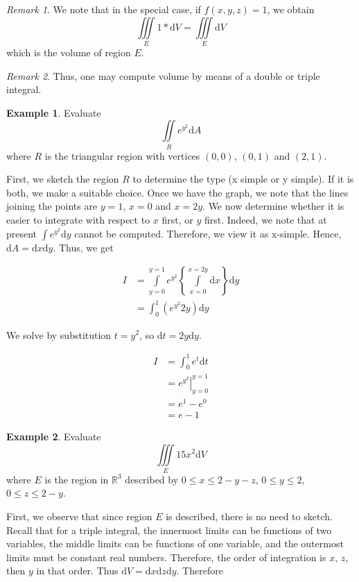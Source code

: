 \documentclass[11pt]{article}
\theoremstyle{plain} %
\theoremstyle{definition}
\theoremstyle{example}
\newtheorem*{example}{Example}
\theoremstyle{remark}
\newtheorem*{remark}{Remark}
\begin{document}
\begin{remark}
We note that in the special case, if $f(x, y, z) = 1$, we obtain $$\iiint\limits_E 1*\mathrm d V = \iiint\limits_E \mathrm d V$$which is the volume of region $E$. 

\end{remark}



\begin{remark}
Thus, one may compute volume by means of a double or triple integral.
\end{remark}


\begin{example}
Evaluate $$\iint\limits_R e^{y^2}\mathrm d A$$ where $R$ is the triangular region with vertices $(0,0)$, $(0,1)$ and $(2,1)$. 
\end{example}

First, we sketch the region $R$ to determine the type (x simple or y simple). If it is both, we make a suitable choice. Once we have the graph, we note that the lines joining the points are $y=1$, $x=0$ and $x=2y$. We now determine whether it is easier to integrate with respect to $x$ first, or $y$ first. Indeed, we note that at present $\int e^{y^2} \mathrm d y$ cannot be computed. Therefore, we view it as x-simple. Hence, $\mathrm d A = \mathrm d x \mathrm d y$. Thus, we get

\begin{align*}
I 	&= \int\limits_{y=0}^{y=1}e^{y^2}\left\{\int\limits_{x=0}^{x=2y}\mathrm d x\right\}\mathrm d y\\
	&= \int_0^1\left(e^{y^2}2y\right)\mathrm d y
\end{align*}

We solve by substitution $t=y^2$, so $\mathrm d t = 2y \mathrm d y$.

\begin{align*}
	I &= \int_0^1e^t\mathrm d t\\
	&= \left.e^{y^2}\right|_{y=0}^{y=1}\\
	&= e^1 - e^0\\
	&= e-1
\end{align*}

\begin{example}
Evaluate $$\iiint\limits_{E} 15x^2 \mathrm d V$$ where $ E$ is the region in $\mathbb R^3$ described by $0 \leq x \leq 2-y-z$, $0\leq y\leq 2$, $0\leq z \leq 2-y$.
\end{example}


First, we observe that since region $E$ is described, there is no need to sketch. Recall that for a triple integral, the innermost limits can be functions of two variables, the middle limits can be functions of one variable, and the outermost limits must be constant real numbers. Therefore, the order of integration is $x$, $z$, then $y$ in that order. Thus $\mathrm d V = \mathrm d x \mathrm d z \mathrm d y$. Therefore
\end{document}

